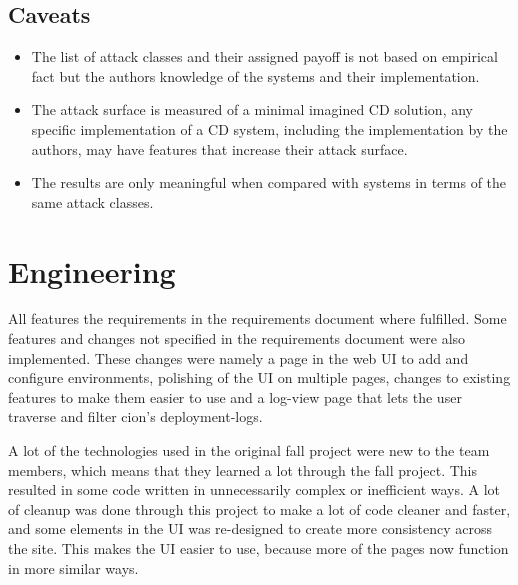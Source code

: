 \subsection{Caveats}
\begin{itemize}
    \item The list of attack classes and their assigned payoff is not based on empirical fact but the authors knowledge of the systems and their implementation.
    \item The attack surface is measured of a minimal imagined CD solution, any specific implementation of a CD system, including the implementation by the authors, may have features that increase their attack surface.
    \item The results are only meaningful when compared with systems in terms of the same attack classes.
\end{itemize}

\section{Engineering}
All features the requirements in the requirements document where fulfilled. Some features and changes not specified in the requirements document were also implemented. These changes were namely a page in the web UI to add and configure environments, polishing of the UI on multiple pages, changes to existing features to make them easier to use and a log-view page that lets the user traverse and filter cion's deployment-logs.

A lot of the technologies used in the original fall project were new to the team members, which means that they learned a lot through the fall project. This resulted in some code written in unnecessarily complex or inefficient ways. A lot of cleanup was done through this project to make a lot of code cleaner and faster, and some elements in the UI was re-designed to create more consistency across the site. This makes the UI easier to use, because more of the pages now function in more similar ways.


